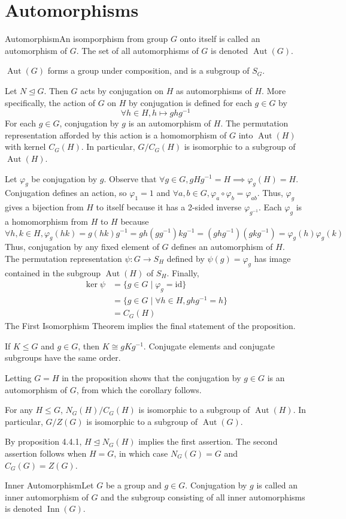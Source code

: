 \documentclass{report}
\newcommand{\cor}[2]{\begin{Corollary}{#1}{}#2\end{Corollary}}
\newcommand{\mprop}[2]{\begin{Prop}{#1}{}#2\end{Prop}}
\newcommand{\dfn}[2]{\begin{Definition}[colbacktitle=red!75!black]{#1}{}#2\end{Definition}}
\newenvironment{myproof}[1][\proofname]{%
	\proof[\bfseries #1: ]%
}{\endproof}
\newcommand{\id}{\mathrm{id}}
\DeclareMathOperator{\Aut}{Aut}
\DeclareMathOperator{\Inn}{Inn}
\begin{document}
\section{Automorphisms}
\dfn{Automorphism}{An isomporphism from group $G$ onto itself is called an automorphism of $G$. The set of all automorphisms of $G$ is denoted $\Aut (G)$. }
$\Aut(G)$ forms a group under composition, and is a subgroup of $S_G$. 
\mprop{}{Let $N \unlhd G$. Then $G$ acts by conjugation on $H$ as automorphisms of $H$. More specifically, the action of $G$ on $H$ by conjugation is defined for each $g \in G$ by
$$\forall h \in H, h \mapsto ghg^{-1}$$
For each $g \in G$, conjugation by $g$ is an automorphism of $H$. The permutation representation afforded by this action is a homomorphism of $G$ into $\Aut (H)$ with kernel $C_G (H)$. In particular, $G/C_G (H)$ is isomorphic to a subgroup of $\Aut (H)$. }
\begin{myproof}
    Let $\varphi_g$ be conjugation by $g$. Observe that $\forall g \in G, gHg^{-1} = H \implies \varphi_g (H) = H$. Conjugation defines an action, so $\varphi_1 = 1$ and $\forall a, b \in G, \varphi_a \circ \varphi_b = \varphi_{ab}$. Thus, $\varphi_g$ gives a bijection from $H$ to itself because it has a 2-sided inverse $\varphi_{g^{-1}}$. Each $\varphi_g$ is a homomorphism from $H$ to $H$ because
    $$\forall h, k \in H, \varphi_g (hk) = g(hk)g^{-1} = gh(gg^{-1})kg^{-1} = (ghg^{-1})(gkg^{-1}) = \varphi_g(h) \varphi_g (k)$$
    Thus, conjugation by any fixed element of $G$ defines an automorphism of $H$. \\
    The permutation representation $\psi : G \to S_H$ defined by $\psi(g) = \varphi_g$ has image contained in the subgroup $\Aut(H)$ of $S_H$. Finally, 
    \begin{align*}
        \ker \psi &= \{ g \in G \mid \varphi_g = \id \}\\
        &= \{g \in G \mid \forall h \in H, ghg^{-1} = h\}\\
        &= C_G(H)
    \end{align*}
    The First Isomorphism Theorem implies the final statement of the proposition. 
\end{myproof}
\cor{}{If $K \leq G$ and $g \in G$, then $K \cong gKg^{-1}$. Conjugate elements and conjugate subgroups have the same order. }
\begin{myproof}
    Letting $G=H$ in the proposition shows that the conjugation by $g \in G$ is an automorphism of $G$, from which the corollary follows. 
\end{myproof}
\cor{}{For any $H \leq G$, $N_G(H)/C_G(H)$ is isomorphic to a subgroup of $\Aut(H)$. In particular, $G/Z(G)$ is isomorphic to a subgroup of $\Aut(G)$. }
\begin{myproof}
    By proposition 4.4.1, $H \unlhd N_G(H)$ implies the first assertion. The second assertion follows when $H=G$, in which case $N_G(G) = G$ and $C_G(G) = Z(G)$. 
\end{myproof}
\dfn{Inner Automorphism}{Let $G$ be a group and $ g \in G$. Conjugation by $g$ is called an inner automorphism of $G$ and the subgroup consisting of all inner automorphisms is denoted $\Inn (G)$. }
\end{document}

